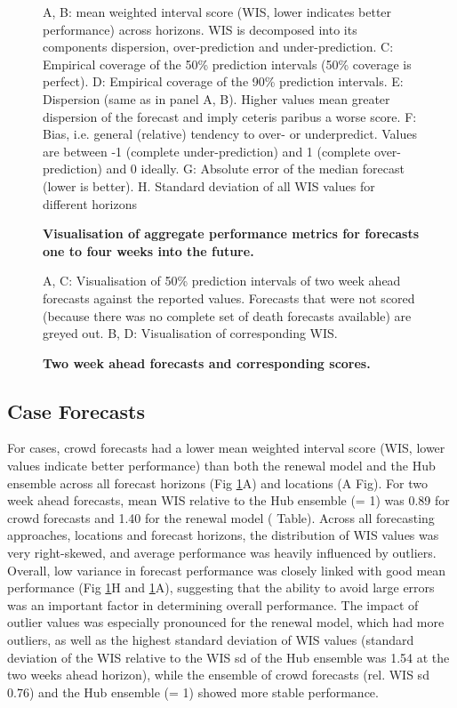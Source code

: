 \documentclass[10pt,letterpaper]{article}
\begin{document}
\begin{figure}[H]
\caption{\bf{Visualisation of aggregate performance metrics for forecasts one to four weeks into the future.}}
A, B: mean weighted interval score (WIS, lower indicates better performance) across horizons. WIS is decomposed into its components dispersion, over-prediction and under-prediction. C: Empirical coverage of the 50\% prediction intervals (50\% coverage is perfect). D: Empirical coverage of the 90\% prediction intervals. E: Dispersion (same as in panel A, B). Higher values mean greater dispersion of the forecast and imply ceteris paribus a worse score. F: Bias, i.e. general (relative) tendency to over- or underpredict. Values are between -1 (complete under-prediction) and 1 (complete over-prediction) and 0 ideally. G: Absolute error of the median forecast (lower is better). H. Standard deviation of all WIS values for different horizons
\label{fig:agg-performance-all}
\end{figure}

\begin{figure}[H]
\caption{\bf{Two week ahead forecasts and corresponding scores. }}
A, C: Visualisation of 50\% prediction intervals of two week ahead forecasts against the reported values. Forecasts that were not scored (because there was no complete set of death forecasts available) are greyed out. B, D: Visualisation of corresponding WIS.
\label{fig:forecasts-and-truth}
\end{figure}

\hypertarget{case-forecasts}{%
\subsection{Case Forecasts}\label{case-forecasts}}

For cases, crowd forecasts had a lower mean weighted interval score
(WIS, lower values indicate better performance) than both the renewal
model and the Hub ensemble across all forecast horizons (Fig
\ref{fig:agg-performance-all}A) and locations
(A Fig). For two week ahead
forecasts, mean WIS relative to the Hub ensemble (= 1) was 0.89 for
crowd forecasts and 1.40 for the renewal model
( Table). Across all forecasting approaches,
locations and forecast horizons, the distribution of WIS values was very
right-skewed, and average performance was heavily influenced by
outliers. Overall, low variance in forecast performance was closely
linked with good mean performance (Fig \ref{fig:agg-performance-all}H
and \ref{fig:agg-performance-all}A), suggesting that the ability to
avoid large errors was an important factor in determining overall
performance. The impact of outlier values was especially pronounced for
the renewal model, which had more outliers, as well as the highest
standard deviation of WIS values (standard deviation of the WIS relative
to the WIS sd of the Hub ensemble was 1.54 at the two weeks ahead
horizon), while the ensemble of crowd forecasts (rel. WIS sd 0.76) and
the Hub ensemble (= 1) showed more stable performance.
\end{document}
